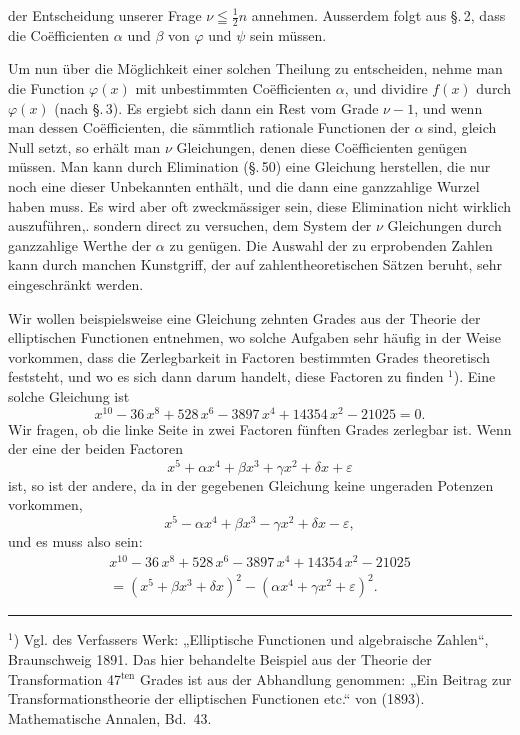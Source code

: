 der Entscheidung unserer Frage $\nu\leqq\frac{1}{2}n$ annehmen. Ausserdem
folgt aus \S.\,2, dass die Coëfficienten $\alpha$ und $\beta$ von $\varphi$ und $\psi$
 sein müssen.

Um nun über die Möglichkeit einer solchen Theilung zu
entscheiden, nehme man die Function $\varphi(x)$ mit unbestimmten
Coëfficienten $\alpha$, und dividire $f(x)$ durch $\varphi(x)$ (nach \S.\,3). Es
ergiebt sich dann ein Rest vom Grade $\nu-1$, und wenn man
dessen Coëfficienten, die sämmtlich rationale Functionen der $\alpha$
sind, gleich Null setzt, so erhält man $\nu$ Gleichungen, denen diese
Coëfficienten genügen müssen. Man kann durch Elimination (\S.\,50)
eine Gleichung herstellen, die nur noch eine dieser Unbekannten
enthält, und die dann eine ganzzahlige Wurzel haben muss. Es
wird aber oft zweckmässiger sein, diese Elimination nicht wirklich
auszuführen,. sondern direct zu versuchen, dem System der %
$\nu$ Gleichungen durch ganzzahlige Werthe der $\alpha$ zu genügen. Die
Auswahl der zu erprobenden Zahlen kann durch manchen Kunstgriff,
der auf zahlentheoretischen Sätzen beruht, sehr eingeschränkt
werden.

Wir wollen beispielsweise eine Gleichung zehnten Grades
aus der Theorie der elliptischen Functionen entnehmen, wo
solche Aufgaben sehr häufig in der Weise vorkommen, dass die
Zerlegbarkeit in Factoren bestimmten Grades theoretisch feststeht,
und wo es sich dann darum handelt, diese Factoren zu
finden $^1$). Eine solche Gleichung ist
\[
x^{10} - 36\,x^8 + 528\,x^6 - 3897\,x^4 + 14354\,x^2 - 21025 = 0.
\]
Wir fragen, ob die linke Seite in zwei Factoren fünften
Grades zerlegbar ist. Wenn der eine der beiden Factoren
\[
x^5 + \alpha x^4 + \beta x^3 + \gamma x^2 + \delta x + \varepsilon
\]
ist, so ist der andere, da in der gegebenen Gleichung keine
ungeraden Potenzen vorkommen,
\[
x^5 - \alpha x^4 + \beta x^3 - \gamma x^2 + \delta x - \varepsilon,
\]
und es muss also sein:
\[
\begin{aligned}
x^{10} - 36\,x^8 + 528\,x^6 - 3897\,x^4 + 14354\,x^2 - 21025 \\
= (x^5 + \beta x^3 + \delta x)^2 - (\alpha x^4 + \gamma x^2 + \varepsilon)^2.
\end{aligned}
\]

\noindent\rule{4cm}{0.4pt}

$^1$) Vgl. des Verfassers Werk: „Elliptische Functionen und algebraische
Zahlen“, Braunschweig 1891. Das hier behandelte Beispiel aus der Theorie
der Transformation 47$^{\text{ten}}$ Grades ist aus der Abhandlung genommen: „Ein
Beitrag zur Transformationstheorie der elliptischen Functionen etc.“ von
 (1893). Mathematische Annalen, Bd.\ 43.
